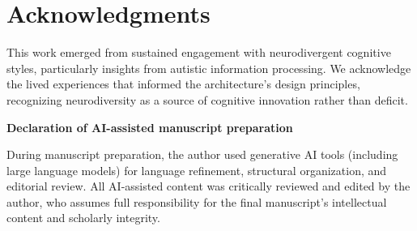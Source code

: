 \documentclass[11pt,a4paper]{article}
\begin{document}
\section*{Acknowledgments}

This work emerged from sustained engagement with neurodivergent cognitive styles, particularly insights from autistic information processing. We acknowledge the lived experiences that informed the architecture's design principles, recognizing neurodiversity as a source of cognitive innovation rather than deficit.

\textbf{Declaration of AI-assisted manuscript preparation}

During manuscript preparation, the author used generative AI tools (including large language models) for language refinement, structural organization, and editorial review. All AI-assisted content was critically reviewed and edited by the author, who assumes full responsibility for the final manuscript's intellectual content and scholarly integrity.



\end{document}
